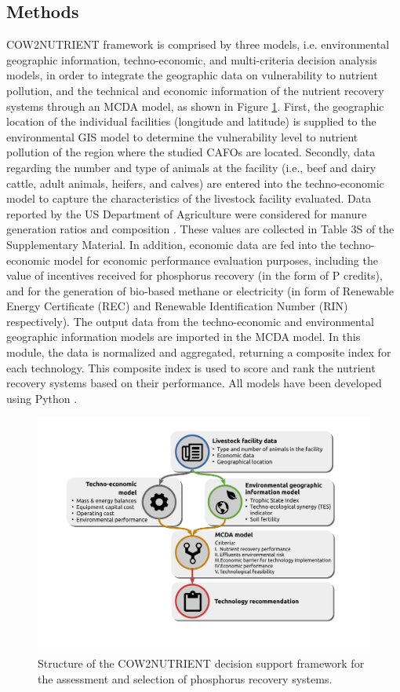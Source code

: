 \begin{refsection}[referencesCh4]
\section{Methods}
COW2NUTRIENT framework is comprised by three models, i.e. environmental geographic information, techno-economic, and multi-criteria decision analysis models, in order to integrate the geographic data on vulnerability to nutrient pollution, and the technical and economic information of the nutrient recovery systems through an MCDA model, as shown in Figure \ref{fig:tool_diagram}. First, the geographic location of the individual facilities (longitude and latitude) is supplied to the environmental GIS model to determine the vulnerability level to nutrient pollution of the region where the studied CAFOs are located. Secondly, data regarding the number and type of animals at the facility (i.e., beef and dairy cattle, adult animals, heifers, and calves) are entered into the techno-economic model to capture the characteristics of the livestock facility evaluated. Data reported by the US Department of Agriculture were considered for manure generation ratios \citep{Kellog2010} and composition \citep{USDAHandbook}. These values are collected in Table 3S of the Supplementary Material. In addition, economic data are fed into the techno-economic model for economic performance evaluation purposes, including the value of incentives received for phosphorus recovery (in the form of P credits), and for the generation of bio-based methane or electricity (in form of Renewable Energy Certificate (REC) and Renewable Identification Number (RIN) respectively). The output data from the techno-economic and environmental geographic information models are imported in the MCDA model. In this module, the data is normalized and aggregated, returning a composite index for each technology. This composite index is used to score and rank the nutrient recovery systems based on their performance. All models have been developed using Python \citep{Python}.


\begin{figure}[h]
	\centering
	\includegraphics[width=0.95\linewidth, trim={3cm 4cm 4cm 1.5cm},clip]{gfx/Chapter4/tool_diagram_v4color.pdf} 
	\caption{Structure of the COW2NUTRIENT decision support framework for the assessment and selection of phosphorus recovery systems.}
	\label{fig:tool_diagram}
\end{figure}


\end{refsection}
